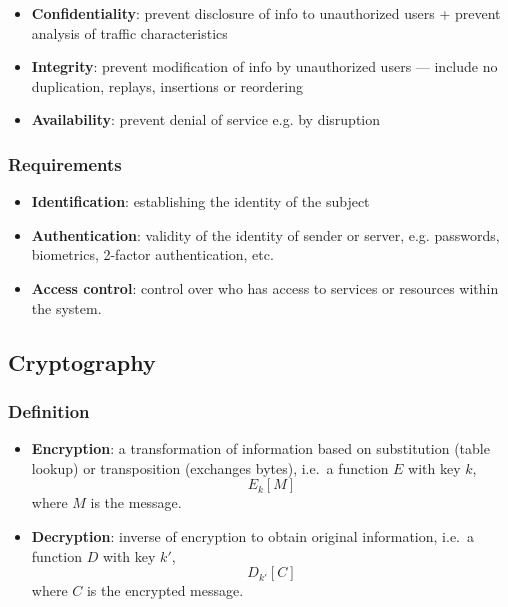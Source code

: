 \documentclass[twocolumn,landscape,10pt]{article}
\theoremstyle{definition}
\begin{document}
\begin{itemize}
    \item \textbf{Confidentiality}: prevent disclosure of info to unauthorized users +
        prevent analysis of traffic characteristics
    \item \textbf{Integrity}: prevent modification of info by unauthorized users ---
        include no duplication, replays, insertions or reordering
    \item \textbf{Availability}: prevent denial of service e.g. by disruption
\end{itemize} 

\subsubsection{Requirements}

\begin{itemize}
    \item \textbf{Identification}: establishing the identity of the subject
    \item \textbf{Authentication}: validity of the identity of sender or server,
        e.g. passwords, biometrics, 2-factor authentication, etc.
    \item \textbf{Access control}: control over who has access to services or resources
        within the system.
\end{itemize} 

\subsection{Cryptography}

\subsubsection{Definition}

\begin{itemize}
    \item \textbf{Encryption}: a transformation of information based on
        substitution (table lookup) or transposition (exchanges bytes), i.e.\ a
        function $E$ with key $k$,
        \[
            E_k[M]
        \]
        where $M$ is the message.
    \item \textbf{Decryption}: inverse of encryption to obtain original
        information, i.e.\ a function $D$ with key $k'$,
        \[
            D_{k'}[C]
        \]
        where $C$ is the encrypted message.
\end{itemize} 
\end{document}

